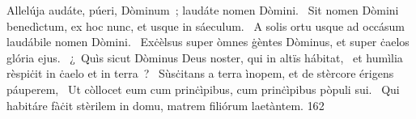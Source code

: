 { Allelúja}
{%
audáte, púeri, Dòminum~; laudáte nomen Dòmini. 
~Sit nomen Dòmini benedìctum, ex hoc nunc, et usque in sáeculum. 
~A solis ortu usque ad occásum laudábile nomen Dòmini. 
~Exċèlsus super òmnes ġèntes Dòminus, et super ċaelos glória ejus. 
~¿~Quìs sicut Dòminus Deus noster, qui in altïs hábitat, 
~et humìlia rèspiċit in ċaelo et in terra~? 
~Sùsċitans a terra ìnopem, et de stèrcore érigens páuperem, 
~Ut còllocet eum cum prinċìpibus, cum prinċìpibus pòpuli sui. 
~Qui habitáre fàċit stèrilem in domu, matrem filiórum laetàntem. 
}
{16}{2}
